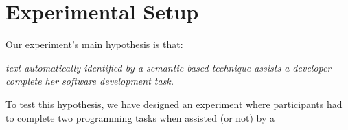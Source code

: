 \clearpage

\section{Experimental Setup}
\label{cp6:procedures}



Our experiment's main hypothesis is that:


\medskip
\begin{bluequote}
    \textit{text automatically identified by a semantic-based technique assists a 
    developer complete her software development task.} 
\end{bluequote}



To test this hypothesis, we have designed an experiment where participants
 had to complete two programming tasks when assisted (or not) by a
